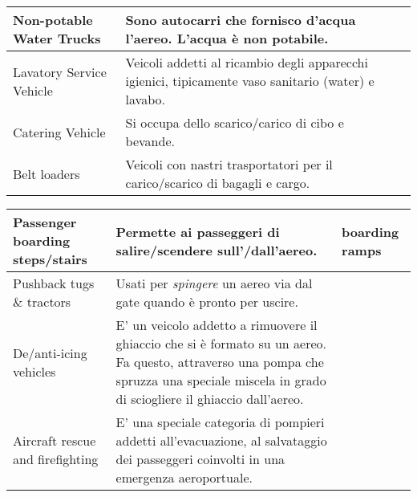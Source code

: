 \begin{table}[htp]
{\begin{tabular}{p{}p{}p{}}
			\hline
			\textsf{\small Non-potable Water Trucks} & \textsf{\small Sono autocarri che fornisco d'acqua l'aereo. L'acqua è non potabile.} & \textsf{\small } \\
			\hline
			\textsf{\small Lavatory Service Vehicle} & \textsf{\small Veicoli addetti al ricambio degli apparecchi igienici, tipicamente vaso sanitario (water) e lavabo.} & \textsf{\small } \\
			\hline
			\textsf{\small Catering Vehicle} & \textsf{\small Si occupa dello scarico/carico di cibo e bevande.} & \textsf{\small } \\
			\hline
			\textsf{\small Belt loaders} & \textsf{\small Veicoli con nastri trasportatori per il carico/scarico di bagagli e cargo.} & \textsf{\small } \\
		\end{tabular}%
	}%
\end{table}

\begin{table}[htp]
	\centering
	{\small %
		\begin{tabular}{p{}p{}p{}}
			\textsf{\small Passenger boarding steps/stairs} & \textsf{\small Permette ai passeggeri di salire/scendere sull'/dall'aereo.} & \textsf{\small boarding ramps} \\
			\hline
			\textsf{\small Pushback tugs \& tractors} & \textsf{\small Usati per \emph{spingere} un aereo via dal gate quando è pronto per uscire.} & \textsf{\small } \\
			\hline
			\textsf{\small De/anti-icing vehicles} & \textsf{\small E' un veicolo addetto a rimuovere il ghiaccio che si è formato su un aereo. Fa questo, attraverso una pompa che spruzza una speciale miscela in grado di sciogliere il ghiaccio dall'aereo.} & \textsf{\small } \\
			\hline
			\textsf{\small Aircraft rescue and firefighting} & \textsf{\small E' una speciale categoria di pompieri addetti all'evacuazione, al salvataggio dei passeggeri coinvolti in una emergenza aeroportuale.} & \textsf{\small } \\
			\hline
		\end{tabular}%
}%
\end{table}

